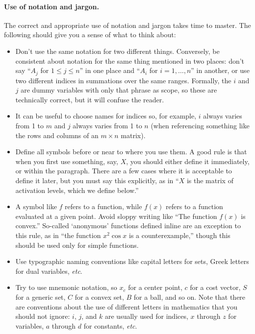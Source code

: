 \documentclass[12pt]{article}
\begin{document}
\paragraph{Use of notation and jargon.}
The correct and appropriate use of notation and jargon takes time to master.
The following should give you a sense of what to think about:

\begin{itemize}
\item Don't use the same notation for two different things. Conversely, be consistent
about notation for the same thing mentioned in two places: don't
say ``$A_j$ for $1 \leq j \leq n$'' in one place and ``$A_i$ for $i=1,\ldots,n$'' 
in another, or use two different indices in summations over the same ranges. 
Formally, the $i$ and $j$ are dummy variables with only that phrase as scope,
so these are technically correct, but it will confuse the reader.

\item It can be useful to choose names for indices so, for example, $i$
always varies from 1 to $m$ and $j$ always varies from 1 to $n$ (when
referencing something like the rows and columns of an $m \times n$ matrix).

\item Define all symbols before or near to where you use them.  A good rule is that
when you first use something, say, $X$, you should either define it immediately, or 
within the paragraph.   There are a few cases where it is acceptable to define it 
later, but you must say this explicitly, as in ``$X$ is the matrix of activation
levels, which we define below.''

\item A symbol like $f$ refers to a function, while $f(x)$ refers to a
function evaluated at a given point. Avoid sloppy writing like ``The function
$f(x)$ is convex.''
So-called `anonymous' functions defined inline are an exception to this rule,
as in ``the function $x^2 \cos x$ is a counterexample,'' though this should
be used only for simple functions.

\item Use typographic naming conventions like capital letters for sets, Greek
letters for dual variables, \emph{etc}.

\item Try to use mnemonic notation, so $x_c$ for a center point,
$c$ for a cost vector, $S$ for a generic set, $C$ for a convex set, $B$
for a ball, and so on. Note that there are conventions about
the use of different letters in mathematics that you should not ignore:
$i$, $j$, and $k$ are usually used for indices, $x$ through $z$ for
variables, $a$ through $d$ for constants, \emph{etc}.


\end{itemize}
\end{document}
